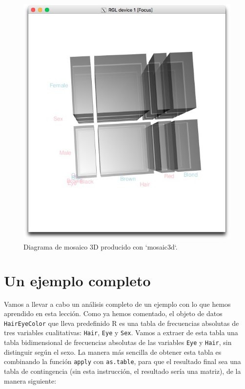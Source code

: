 \documentclass[
]{book}
\theoremstyle{definition}
\theoremstyle{definition}
\theoremstyle{definition}
\theoremstyle{remark}
\begin{document}
\begin{figure}

{\centering \includegraphics[width=0.9\linewidth]{AprendeR-Parte-I_files/figure-html/exmosaic3d} 

}

\caption{Diagrama de mosaico 3D producido con `mosaic3d`.}\label{fig:extresqualb}
\end{figure}

\hypertarget{sec:exqual}{%
\section{Un ejemplo completo}\label{sec:exqual}}

Vamos a llevar a cabo un análisis completo de un ejemplo con lo que hemos aprendido en esta lección. Como ya hemos comentado, el objeto de datos \texttt{HairEyeColor} que lleva predefinido R es una tabla de frecuencias absolutas de tres variables cualitativas: \texttt{Hair}, \texttt{Eye} y \texttt{Sex}. Vamos a extraer de esta tabla una tabla bidimensional de frecuencias absolutas de las variables \texttt{Eye} y \texttt{Hair}, sin distinguir según el sexo. La manera más sencilla de obtener esta tabla es combinando la función \texttt{apply} con \texttt{as.table}, para que el resultado final sea una tabla de contingencia (sin esta instrucción, el resultado sería una matriz), de la manera siguiente:
\end{document}
